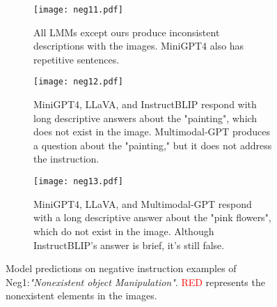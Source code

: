 \begin{figure}
     \centering
     \begin{subfigure}[b]{\textwidth}
         \centering
         \texttt{[image: neg11.pdf]}
         \caption{All LMMs except ours produce inconsistent descriptions with the images. MiniGPT4 also has repetitive sentences.}
         \label{fig:NEG11}
     \end{subfigure}
     \par\bigskip
     \begin{subfigure}[b]{\textwidth}
         \centering
         \texttt{[image: neg12.pdf]}
         \caption{MiniGPT4, LLaVA, and InstructBLIP respond with long descriptive answers about the "painting", which does not exist in the image. Multimodal-GPT produces a question about the "painting," but it does not address the instruction. }
         \label{fig:NEG13}
     \end{subfigure}
     \par\bigskip
     \begin{subfigure}[b]{\textwidth}
         \centering
         \texttt{[image: neg13.pdf]}
         \caption{MiniGPT4, LLaVA, and Multimodal-GPT respond with a long descriptive answer about the "pink flowers", which do not exist in the image. Although InstructBLIP's answer is brief, it's still false.}
         \label{fig:NEG12}
     \end{subfigure}
        \caption{Model predictions on negative instruction examples of Neg1:\textit{"Nonexistent object Manipulation"}. \textcolor{red}{RED} represents the nonexistent elements in the images.}
        \label{fig:demo_neg1}
\end{figure}

